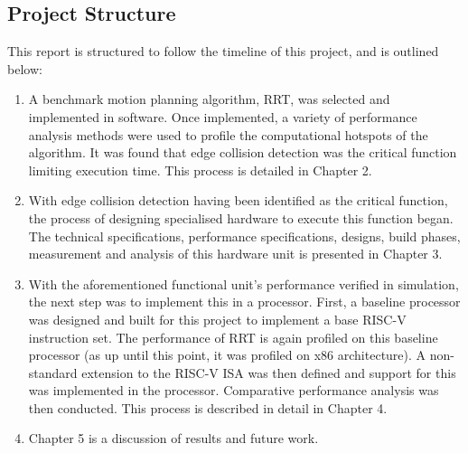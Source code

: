 
\subsection{Project Structure}
\label{subsection:project_structure}
    This report is structured to follow the timeline of this project, and is outlined below:
    \begin{enumerate}
        \item A benchmark motion planning algorithm, \ac{RRT}, was selected and implemented in software. Once implemented, a variety of performance analysis methods were used to profile the computational hotspots of the algorithm. It was found that edge collision detection was the critical function limiting execution time. This process is detailed in Chapter 2.
        \item With edge collision detection having been identified as the critical function, the process of designing specialised hardware to execute this function began. The technical specifications, performance specifications, designs, build phases, measurement and analysis of this hardware unit is presented in Chapter 3.
        \item With the aforementioned functional unit's performance verified in simulation, the next step was to implement this in a processor. First, a baseline processor was designed and built for this project to implement a base RISC-V instruction set. The performance of \ac{RRT} is again profiled on this baseline processor (as up until this point, it was profiled on x86 architecture). A non-standard extension to the RISC-V \ac{ISA} was then defined and support for this was implemented in the processor. Comparative performance analysis was then conducted. This process is described in detail in Chapter 4.
        \item Chapter 5 is a discussion of results and future work.
    \end{enumerate}

